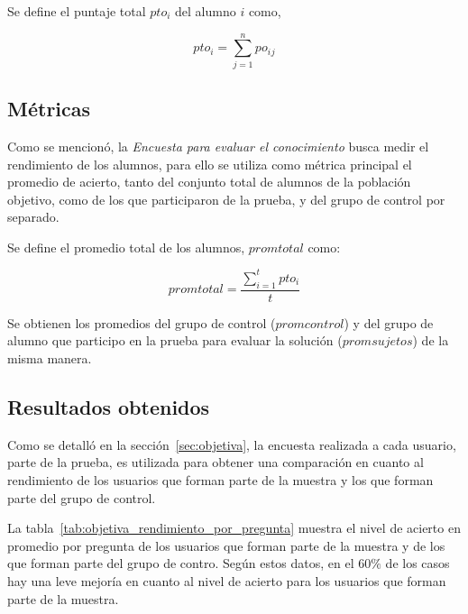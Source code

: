 Se define el puntaje total $pto_i$ del alumno $i$ como, 

\begin{equation*}
    pto_i = \sum_{j=1}^n{po_i{_j}}
\end{equation*}


\subsection{Métricas}

Como se mencionó, la \emph{Encuesta para evaluar el conocimiento} busca medir el rendimiento de los 
alumnos, para ello se utiliza como métrica principal el promedio de acierto, 
tanto del conjunto total de alumnos de la población objetivo, como de los que participaron de la
prueba, y del grupo de control por separado.

Se define el promedio total de los alumnos, $promtotal$ como:

\begin{equation*}
    promtotal = \frac{\sum_{i=1}^t{pto_i}}{t}
\end{equation*}

Se obtienen los promedios del grupo de control ($promcontrol$) y del grupo de alumno que
participo en la prueba para evaluar la solución ($promsujetos$) de la misma manera.

\subsection{Resultados obtenidos}
\label{sec:res_objetiva}

Como se detalló en la sección~\ref{sec:objetiva}, la encuesta realizada a cada
usuario, parte de la prueba, es utilizada para obtener una comparación en cuanto
al rendimiento de los usuarios que forman parte de la muestra y los que forman
parte del grupo de control.



La tabla~\ref{tab:objetiva_rendimiento_por_pregunta} muestra el nivel de acierto
en promedio por pregunta de los usuarios que forman parte de la muestra y de los
que forman parte del grupo de contro. Según estos datos, en el $60\%$ de los casos 
hay una leve mejoría en cuanto al nivel de acierto para los usuarios que forman 
parte de la muestra.

